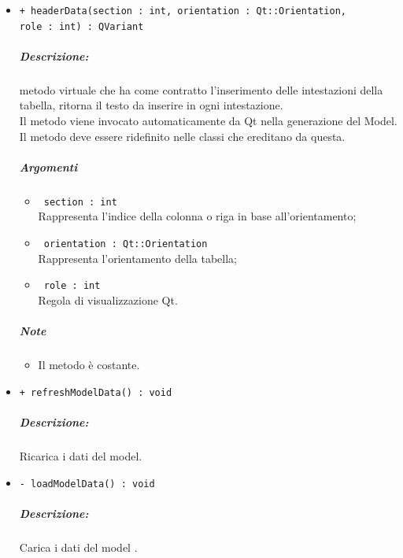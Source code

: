 {\begin{itemize}
\begin{itemize}
			\item \color{RoyalPurple}\verb! role : int!\\
			\color{black}Regola di visualizzazione Qt\g{}.
		\end{itemize}
	\subparagraph{Note}
			\begin{itemize}
				\item Il metodo è costante.
			\end{itemize}
		
	\item \color{blue}\verb!+ headerData(section : int, orientation : Qt::Orientation,!\\
	  \verb!role : int) : QVariant!\\
	\color{black}
	\subparagraph{Descrizione:} metodo virtuale che ha come contratto l'inserimento delle intestazioni della tabella, ritorna il testo da inserire in ogni intestazione.\\
	Il metodo viene invocato automaticamente da Qt\g{} nella generazione del Model.\\
	Il metodo deve essere ridefinito nelle classi che ereditano da questa.\\
	\subparagraph{Argomenti}
		\begin{itemize}
			\item \color{RoyalPurple}\verb! section : int!\\
			\color{black}Rappresenta l'indice della colonna o riga in base all'orientamento;
			
			\item \color{RoyalPurple}\verb! orientation : Qt::Orientation!\\
			\color{black}Rappresenta l'orientamento della tabella;
			
			\item \color{RoyalPurple}\verb! role : int!\\
			\color{black}Regola di visualizzazione Qt\g{}.
		\end{itemize}
	\subparagraph{Note}
			\begin{itemize}
				\item Il metodo è costante.
			\end{itemize}
		
	\item \color{blue}\verb!+ refreshModelData() : void!\\
		\color{black}
		\subparagraph{Descrizione:} Ricarica i dati del model.\\
			
	\item \color{blue}\verb!- loadModelData() : void!\\
		\color{black}
		\subparagraph{Descrizione:} Carica i dati del model .\\
\end{itemize}
\pagebreak

}

